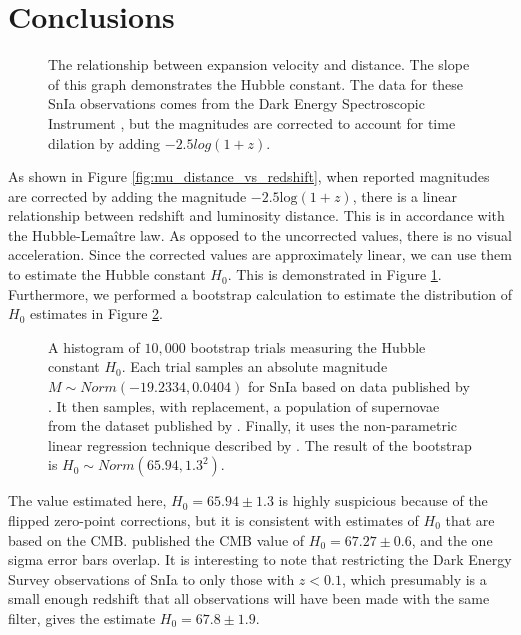 \documentclass[linenumbers]{aastex631}
\begin{document}
\section{Conclusions}
\label{sec:conslusions}

\begin{figure}
  \caption{The relationship between expansion velocity and distance. The slope
  of this graph demonstrates the Hubble constant. The data for these SnIa
  observations comes from the Dark Energy Spectroscopic Instrument
  \citep{vincenzi2024}, but the magnitudes are corrected to account for time
  dilation by adding $-2.5 log(1 + z)$.
  }
\label{fig:expansion}
\end{figure}

As shown in Figure \ref{fig:mu_distance_vs_redshift}, when reported magnitudes
are corrected by adding the magnitude $-2.5\text{log}(1+z)$, there is a linear
relationship between redshift and luminosity distance. This is in accordance
with the Hubble-Lema\^{i}tre law. As opposed to the uncorrected values, there
is no visual acceleration. Since the corrected values are approximately linear,
we can use them to estimate the Hubble constant $H_0$. This is demonstrated in
Figure \ref{fig:expansion}. Furthermore, we performed a bootstrap calculation
to estimate the distribution of $H_0$ estimates in Figure
\ref{fig:H0bootstrap}.

\begin{figure}
  \caption{A histogram of $10{,}000$ bootstrap trials measuring the Hubble constant
  $H_0$. Each trial samples an absolute magnitude $M \sim Norm(-19.2334,
  0.0404)$ for SnIa based on data published by \citet{camarena2020}. It then samples,
  with replacement, a population of supernovae from the dataset published by
  \citet{abbott2024}. Finally, it uses the non-parametric linear regression
  technique described by \citet{siegel1982}. The result of the bootstrap is $H_0
  \sim Norm(65.94, 1.3^2)$.
  }
\label{fig:H0bootstrap}
\end{figure}

The value estimated here, $H_0 = 65.94 \pm 1.3$ is highly suspicious
because of the flipped zero-point corrections, but it is consistent with
estimates of $H_0$ that are based on the CMB. \citet{planck2020} published the
CMB value of $H_0 = 67.27 \pm 0.6$, and the one sigma error bars overlap. It
is interesting to note that restricting the Dark Energy Survey observations of
SnIa \citep{vincenzi2024} to only those with $z < 0.1$, which presumably is a
small enough redshift that all observations will have been made with the same
filter, gives the estimate $H_0 = 67.8 \pm 1.9$.
\end{document}
